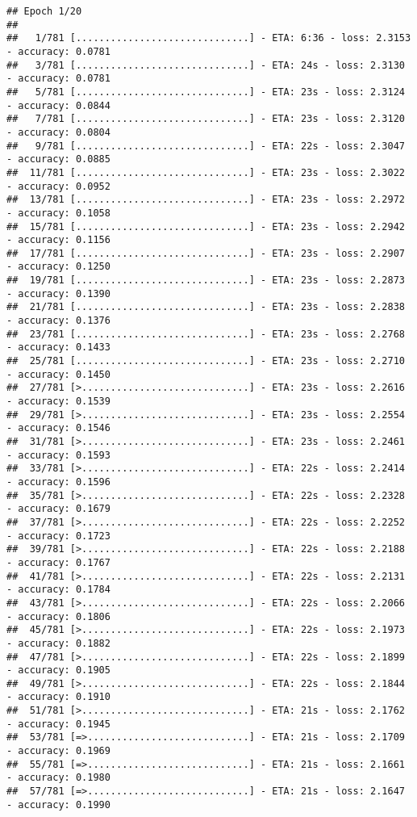 \documentclass[
]{article}
\begin{document}
\begin{verbatim}
## Epoch 1/20
## 
##   1/781 [..............................] - ETA: 6:36 - loss: 2.3153 - accuracy: 0.0781
##   3/781 [..............................] - ETA: 24s - loss: 2.3130 - accuracy: 0.0781 
##   5/781 [..............................] - ETA: 23s - loss: 2.3124 - accuracy: 0.0844
##   7/781 [..............................] - ETA: 23s - loss: 2.3120 - accuracy: 0.0804
##   9/781 [..............................] - ETA: 22s - loss: 2.3047 - accuracy: 0.0885
##  11/781 [..............................] - ETA: 23s - loss: 2.3022 - accuracy: 0.0952
##  13/781 [..............................] - ETA: 23s - loss: 2.2972 - accuracy: 0.1058
##  15/781 [..............................] - ETA: 23s - loss: 2.2942 - accuracy: 0.1156
##  17/781 [..............................] - ETA: 23s - loss: 2.2907 - accuracy: 0.1250
##  19/781 [..............................] - ETA: 23s - loss: 2.2873 - accuracy: 0.1390
##  21/781 [..............................] - ETA: 23s - loss: 2.2838 - accuracy: 0.1376
##  23/781 [..............................] - ETA: 23s - loss: 2.2768 - accuracy: 0.1433
##  25/781 [..............................] - ETA: 23s - loss: 2.2710 - accuracy: 0.1450
##  27/781 [>.............................] - ETA: 23s - loss: 2.2616 - accuracy: 0.1539
##  29/781 [>.............................] - ETA: 23s - loss: 2.2554 - accuracy: 0.1546
##  31/781 [>.............................] - ETA: 23s - loss: 2.2461 - accuracy: 0.1593
##  33/781 [>.............................] - ETA: 22s - loss: 2.2414 - accuracy: 0.1596
##  35/781 [>.............................] - ETA: 22s - loss: 2.2328 - accuracy: 0.1679
##  37/781 [>.............................] - ETA: 22s - loss: 2.2252 - accuracy: 0.1723
##  39/781 [>.............................] - ETA: 22s - loss: 2.2188 - accuracy: 0.1767
##  41/781 [>.............................] - ETA: 22s - loss: 2.2131 - accuracy: 0.1784
##  43/781 [>.............................] - ETA: 22s - loss: 2.2066 - accuracy: 0.1806
##  45/781 [>.............................] - ETA: 22s - loss: 2.1973 - accuracy: 0.1882
##  47/781 [>.............................] - ETA: 22s - loss: 2.1899 - accuracy: 0.1905
##  49/781 [>.............................] - ETA: 22s - loss: 2.1844 - accuracy: 0.1910
##  51/781 [>.............................] - ETA: 21s - loss: 2.1762 - accuracy: 0.1945
##  53/781 [=>............................] - ETA: 21s - loss: 2.1709 - accuracy: 0.1969
##  55/781 [=>............................] - ETA: 21s - loss: 2.1661 - accuracy: 0.1980
##  57/781 [=>............................] - ETA: 21s - loss: 2.1647 - accuracy: 0.1990

\end{verbatim}
\end{document}
